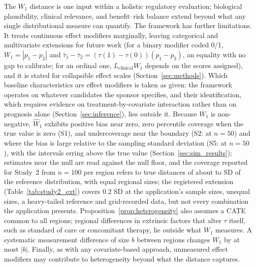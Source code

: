 \documentclass[AMA,Times1COL]{WileyNJDv5}
\begin{document}
The $W_1$ distance is one input within a holistic regulatory evaluation; biological plausibility, clinical relevance, and benefit--risk balance extend beyond what any single distributional measure can quantify.\cite{iche17,matsushima2024} The framework has further limitations. It treats continuous effect modifiers marginally, leaving categorical and multivariate extensions for future work (for a binary modifier coded 0/1, $W_1 = |p_1 - p_2|$ and $\bar{\tau}_1 - \bar{\tau}_2 = (\tau(1) - \tau(0))(p_1 - p_2)$, an equality with no gap to calibrate; for an ordinal one, $L_{\text{clinical}} W_1$ depends on the scores assigned), and it is stated for collapsible effect scales (Section~\ref{sec:methods}). Which baseline characteristics are effect modifiers is taken as given: the framework operates on whatever candidates the sponsor specifies, and their identification, which requires evidence on treatment-by-covariate interaction rather than on prognosis alone (Section~\ref{sec:inference}), lies outside it.
Because $W_1$ is non-negative, $\widehat{W}_1$ exhibits positive bias near zero, zero percentile coverage when the true value is zero (S1), and undercoverage near the boundary (S2:  at $n = 50$) and where the bias is large relative to the sampling standard deviation (S5:  at $n = 50$), with the intervals erring above the true value (Section~\ref{sec:sim_results});\cite{andrews2000} estimates near the null are read against the null floor, and the coverage reported for Study~2 from $n = 100$ per region refers to true distances of about  to  SD of the reference distribution, with equal regional sizes; the registered extension (Table~\ref{tab:study2_ext}) covers 0.2 SD at the application's sample sizes, unequal sizes, a heavy-tailed reference and grid-recorded data, but not every combination the application presents. Proposition~\ref{prop:heterogeneity} also assumes a CATE common to all regions; regional differences in extrinsic factors that alter $\tau$ itself, such as standard of care or concomitant therapy, lie outside what $W_1$ measures. A systematic measurement difference of size $b$ between regions changes $W_1$ by at most $|b|$. Finally, as with any covariate-based approach, unmeasured effect modifiers may contribute to heterogeneity beyond what the distance captures.
\end{document}
